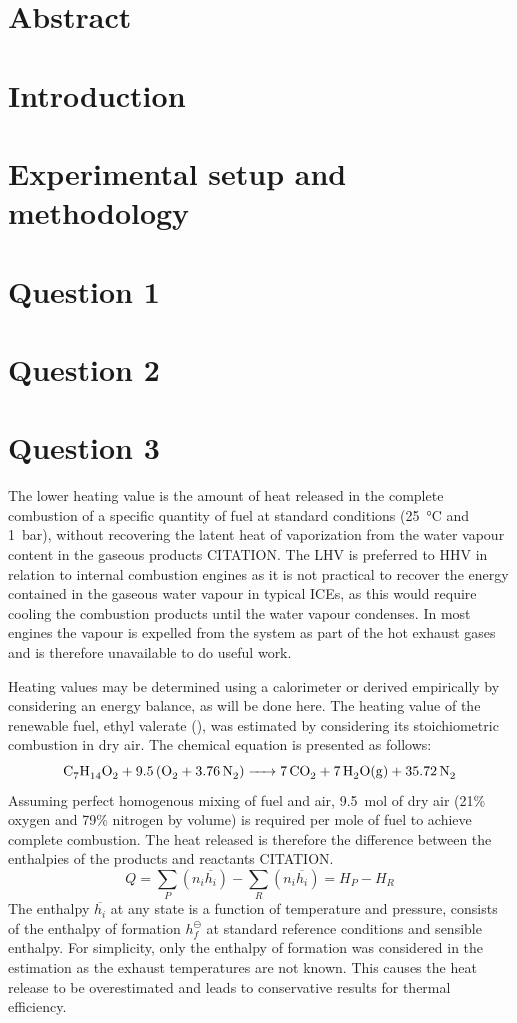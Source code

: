 \documentclass[11pt]{article}
\begin{document}
\section*{Abstract}
\section*{Introduction}
\section*{Experimental setup and methodology}
\section*{Question 1}
\section*{Question 2}
\section*{Question 3}
The lower heating value is the amount of heat released in the complete combustion of a specific quantity of fuel at standard conditions (\SI{25}{\celsius} and \SI{1}{\bar}), without recovering the latent heat of vaporization from the water vapour content in the gaseous products CITATION. The LHV is preferred to HHV in relation to internal combustion engines as it is not practical to recover the energy contained in the gaseous water vapour in typical ICEs, as this would require cooling the combustion products until the water vapour condenses. In most engines the vapour is expelled from the system as part of the hot exhaust gases and is therefore unavailable to do useful work. 

Heating values may be determined using a calorimeter or derived empirically by considering an energy balance, as will be done here. The heating value of the renewable fuel, ethyl valerate (), was estimated by considering its stoichiometric combustion in dry air. The chemical equation is presented as follows: 
\begin{equation}
    \ce{C7H14O2 + 9.5(O2 + 3.76N2) -> 7CO2 + 7H2O(g) + 35.72N2} \label{q3-1}
\end{equation}
Assuming perfect homogenous mixing of fuel and air, \SI{9.5}{\mol} of dry air (21\% oxygen and 79\% nitrogen by volume) is required per mole of fuel to achieve complete combustion. The heat released is therefore the difference between the enthalpies of the products and reactants CITATION.
\begin{equation}
    Q = \sum_P \left(n_i\overline{h_i}\right) - \sum_R \left(n_i\overline{h_i}\right) = H_P - H_R \label{q3-2}
\end{equation}
The enthalpy $\overline{h_i}$ at any state is a function of temperature and pressure, consists of the enthalpy of formation $h_f^{\ominus}$ at standard reference conditions and sensible enthalpy. For simplicity, only the enthalpy of formation was considered in the estimation as the exhaust temperatures are not known. This causes the heat release to be overestimated and leads to conservative results for thermal efficiency. 
\end{document}
